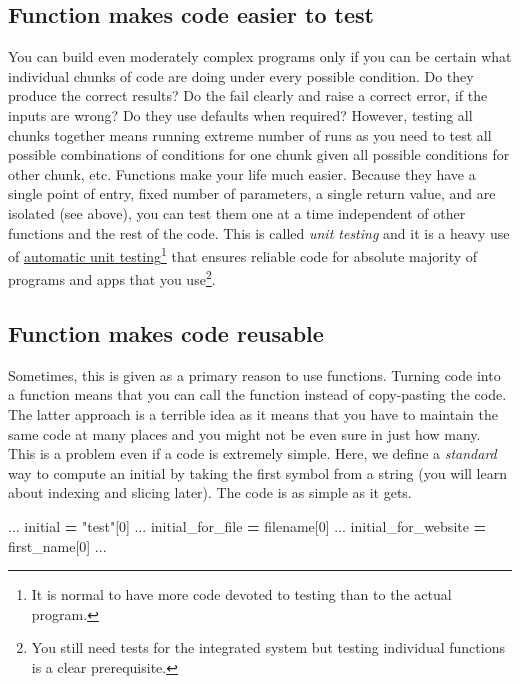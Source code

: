\documentclass[
]{book}
\newenvironment{Shaded}{\begin{snugshade}}{\end{snugshade}}
\newcommand{\DecValTok}[1]{\textcolor[rgb]{0.00,0.00,0.81}{#1}}
\newcommand{\NormalTok}[1]{#1}
\newcommand{\OperatorTok}[1]{\textcolor[rgb]{0.81,0.36,0.00}{\textbf{#1}}}
\newcommand{\StringTok}[1]{\textcolor[rgb]{0.31,0.60,0.02}{#1}}
\begin{document}
\hypertarget{function-makes-code-easier-to-test}{%
\subsection{Function makes code easier to test}\label{function-makes-code-easier-to-test}}

You can build even moderately complex programs only if you can be certain what individual chunks of code are doing under every possible condition. Do they produce the correct results? Do the fail clearly and raise a correct error, if the inputs are wrong? Do they use defaults when required? However, testing all chunks together means running extreme number of runs as you need to test all possible combinations of conditions for one chunk given all possible conditions for other chunk, etc. Functions make your life much easier. Because they have a single point of entry, fixed number of parameters, a single return value, and are isolated (see above), you can test them one at a time independent of other functions and the rest of the code. This is called \emph{unit testing} and it is a heavy use of \href{https://docs.python.org/3/library/unittest.html}{automatic unit testing}\footnote{It is normal to have more code devoted to testing than to the actual program.} that ensures reliable code for absolute majority of programs and apps that you use\footnote{You still need tests for the integrated system but testing individual functions is a clear prerequisite.}.

\hypertarget{function-makes-code-reusable}{%
\subsection{Function makes code reusable}\label{function-makes-code-reusable}}

Sometimes, this is given as a primary reason to use functions. Turning code into a function means that you can call the function instead of copy-pasting the code. The latter approach is a terrible idea as it means that you have to maintain the same code at many places and you might not be even sure in just how many. This is a problem even if a code is extremely simple. Here, we define a \emph{standard} way to compute an initial by taking the first symbol from a string (you will learn about indexing and slicing later). The code is as simple as it gets.

\begin{Shaded}
\begin{Highlighting}[]
\NormalTok{...}
\NormalTok{initial }\OperatorTok{=} \StringTok{"test"}\NormalTok{[}\DecValTok{0}\NormalTok{]}
\NormalTok{...}
\NormalTok{initial\_for\_file }\OperatorTok{=}\NormalTok{ filename[}\DecValTok{0}\NormalTok{]}
\NormalTok{...}
\NormalTok{initial\_for\_website }\OperatorTok{=}\NormalTok{ first\_name[}\DecValTok{0}\NormalTok{]}
\NormalTok{...}
\end{Highlighting}
\end{Shaded}
\end{document}
